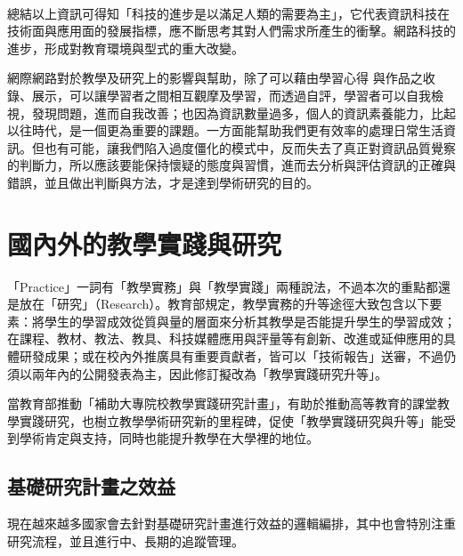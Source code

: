 \\
\par
\renewcommand{\baselinestretch}{1} %
\twelve 總結以上資訊可得知「科技的進步是以滿足人類的需要為主」，它代表資訊科技在技術面與應用面的發展指標，應不斷思考其對人們需求所產生的衝擊。網路科技的進步，形成對教育環境與型式的重大改變。
\\
\par
\renewcommand{\baselinestretch}{1} %
\twelve 網際網路對於教學及研究上的影響與幫助，除了可以藉由學習心得 與作品之收錄、展示，可以讓學習者之間相互觀摩及學習，而透過自評，學習者可以自我檢視，發現問題，進而自我改善；也因為資訊數量過多，個人的資訊素養能力，比起以往時代，是一個更為重要的課題。一方面能幫助我們更有效率的處理日常生活資訊。但也有可能，讓我們陷入過度僵化的模式中，反而失去了真正對資訊品質覺察的判斷力，所以應該要能保持懷疑的態度與習慣，進而去分析與評估資訊的正確與錯誤，並且做出判斷與方法，才是達到學術研究的目的。
\par

\renewcommand{\baselinestretch}{20} %
\section{國內外的教學實踐與研究}
\par
\renewcommand{\baselinestretch}{1} %
\twelve 「Practice」一詞有「教學實務」與「教學實踐」兩種說法，不過本次的重點都還是放在「研究」（Research）。教育部規定，教學實務的升等途徑大致包含以下要素：將學生的學習成效從質與量的層面來分析其教學是否能提升學生的學習成效；在課程、教材、教法、教具、科技媒體應用與評量等有創新、改進或延伸應用的具體研發成果；或在校內外推廣具有重要貢獻者，皆可以「技術報告」送審，不過仍須以兩年內的公開發表為主，因此修訂擬改為「教學實踐研究升等」。
\\
\par
\renewcommand{\baselinestretch}{1} %
\twelve  當教育部推動「補助大專院校教學實踐研究計畫」，有助於推動高等教育的課堂教學實踐研究，也樹立教學學術研究新的里程碑，促使「教學實踐研究與升等」能受到學術肯定與支持，同時也能提升教學在大學裡的地位。
\par

\renewcommand{\baselinestretch}{20} %
\subsection{基礎研究計畫之效益}
\par
\renewcommand{\baselinestretch}{1} %
\twelve 現在越來越多國家會去針對基礎研究計畫進行效益的邏輯編排，其中也會特別注重研究流程，並且進行中、長期的追蹤管理。
\par

